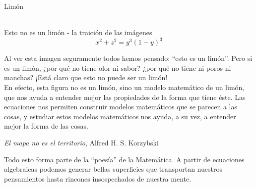 \documentclass[es]{SurferDesc}%
\begin{document}
\footnotesize

\begin{surferPage}
  \begin{surferTitle}Lim\'on\end{surferTitle}  \\ %
Esto no es un lim\'on - la traici\'on de las im\'agenes\\
\smallskip
\[x^2 + z^2 = y^3 (1 - y)^3\] 

\vspace{0.3cm}
Al ver esta imagen seguramente todos hemos pensado: “esto es un lim\'on”. Pero si es un lim\'on, ¿por qu\'e no tiene olor ni sabor? ¿por qu\'e no tiene ni poros ni manchas? ¡Est\'a claro que esto no puede ser un lim\'on!\\
\vspace{0.3cm}
En efecto, esta figura no es un lim\'on, sino un modelo matem\'atico de un lim\'on, que nos ayuda a entender mejor las propiedades de la forma que tiene \'este. Las ecuaciones nos permiten construir modelos matem\'aticos que se parecen a las cosas, y estudiar estos modelos matem\'aticos nos ayuda, a su vez, a entender mejor la forma de las cosas.
\vspace{0.3cm}
\begin{center}
\emph{El mapa no es el territorio}, Alfred H. S. Korzybski
\end{center}
\vspace{0.3cm}
Todo esto forma parte de la “poes\'ia” de la Matem\'atica. A partir de ecuaciones algebraicas podemos generar bellas superficies que transportan nuestros pensamientos hasta rincones insospechados de nuestra mente.

  \begin{surferText}
     \end{surferText}
\end{surferPage}
\end{document}
